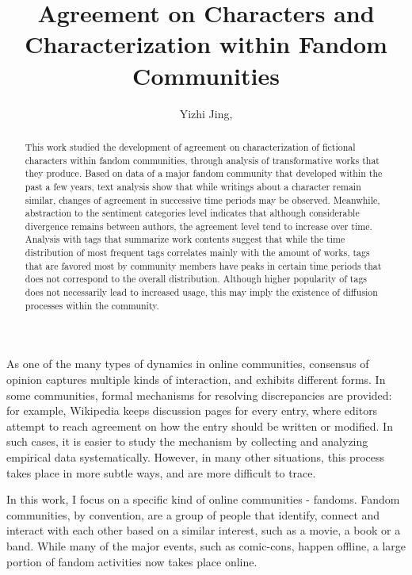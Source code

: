 \documentclass{pnastwo}
\begin{document}
\title{Agreement on Characters and Characterization within Fandom Communities}

\author{Yizhi Jing,
}


\maketitle

\begin{article}
\begin{abstract}
{This work studied the development of agreement on characterization of fictional characters within fandom communities, through analysis of transformative works that they produce. Based on data of a major fandom community that developed within the past a few years,  text analysis show that while writings about a character remain similar, changes of agreement in successive time periods may be observed. Meanwhile,  abstraction to the sentiment categories level indicates that although considerable divergence remains between authors, the agreement level tend to increase over time. Analysis with tags that summarize work contents suggest that while the time distribution of most frequent tags correlates mainly with the amount of works, tags that are favored most by community members have peaks in certain time periods that does not correspond to the overall distribution. Although higher popularity of tags does not necessarily lead to increased usage, this may imply the existence of diffusion processes within the community. }
\end{abstract}


As one of the many types of dynamics in online communities, consensus of opinion captures multiple kinds of interaction, and exhibits different forms. In some communities, formal mechanisms for resolving discrepancies are provided: for example, Wikipedia keeps discussion pages for every entry, where editors attempt to reach agreement on how the entry should be written or modified. In such cases, it is easier to study the mechanism by collecting and analyzing empirical data systematically\cite{Kriplean:2007:CCC:1316624.1316648}. However, in many other situations, this process takes place in more subtle ways, and are more difficult to trace. 

In this work, I focus on a specific kind of online communities - fandoms. Fandom communities, by convention, are a group of people that identify, connect and interact with each other based on a similar interest, such as a movie, a book or a band\cite{wiki:fandom}. While many of the major events, such as comic-cons, happen offline, a large portion of fandom activities now takes place online.


\end{article}
\end{document}
